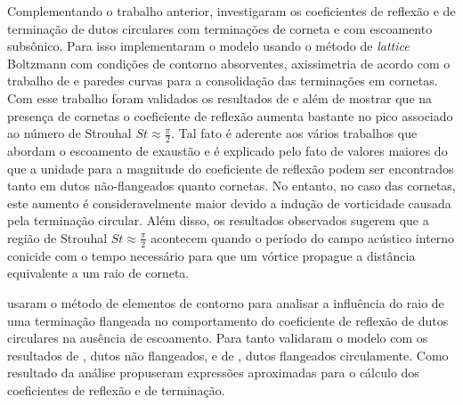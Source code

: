 Complementando o trabalho anterior,  investigaram os coeficientes de reflexão e de terminação de dutos circulares com terminações de corneta e com escoamento subsônico. Para isso implementaram o modelo usando o método de \textit{lattice} Boltzmann com condições de contorno absorventes, axissimetria de acordo com o trabalho de  e paredes curvas para a consolidação das terminações em cornetas. Com esse trabalho foram validados os resultados de  e  além de mostrar que na presença de cornetas o coeficiente de reflexão aumenta bastante no pico associado ao número de Strouhal $St \approx \frac{\pi}{2}$. Tal fato é aderente aos vários trabalhos que abordam o escoamento de exaustão e é explicado pelo fato de valores maiores do que a unidade para a magnitude do coeficiente de reflexão podem ser encontrados tanto em dutos não-flangeados quanto cornetas. No entanto, no caso das cornetas, este aumento é consideravelmente maior devido a indução de vorticidade causada pela terminação circular. Além disso, os resultados observados sugerem que a região de Strouhal $St \approx \frac{\pi}{2}$ acontecem quando o período do campo acústico interno conicide com o tempo necessário para que um vórtice propague a distância equivalente a um raio de corneta.

 usaram o método de elementos de contorno para analisar a influência do raio de uma terminação flangeada no comportamento do coeficiente de reflexão de dutos circulares na ausência de escoamento. Para tanto validaram o modelo com os resultados de , dutos não flangeados, e de , dutos flangeados circulamente. Como resultado da análise propuseram expressões aproximadas para o cálculo dos coeficientes de reflexão e de terminação.
